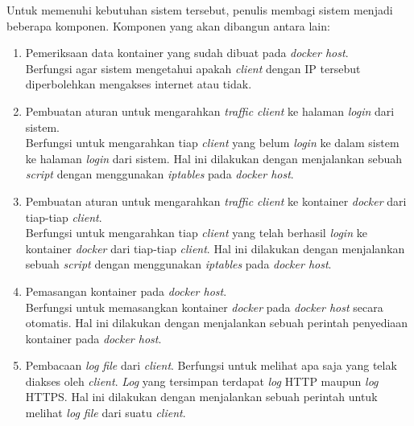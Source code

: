       \indent Untuk memenuhi kebutuhan sistem tersebut, penulis membagi sistem menjadi beberapa komponen. Komponen yang akan dibangun antara lain: 
      \begin{enumerate} 
	  \item Pemeriksaan data kontainer yang sudah dibuat pada \textit{docker host}.\\
		  Berfungsi agar sistem mengetahui apakah \textit{client} dengan IP tersebut diperbolehkan mengakses internet atau tidak.
	  \item Pembuatan aturan untuk mengarahkan \textit{traffic client} ke halaman \textit{login} dari sistem.\\
		  Berfungsi untuk mengarahkan tiap \textit{client} yang belum \textit{login} ke dalam sistem ke halaman \textit{login} dari sistem. Hal ini dilakukan dengan menjalankan sebuah \textit{script} dengan menggunakan \textit{iptables} pada \textit{docker host}.
	  \item Pembuatan aturan untuk mengarahkan \textit{traffic client} ke kontainer \textit{docker} dari tiap-tiap \textit{client}.\\
		  Berfungsi untuk mengarahkan tiap \textit{client} yang telah berhasil \textit{login} ke kontainer \textit{docker} dari tiap-tiap \textit{client}. Hal ini dilakukan dengan menjalankan sebuah \textit{script} dengan menggunakan \textit{iptables} pada \textit{docker host}.
	  \item Pemasangan kontainer pada \textit{docker host}.\\
		  Berfungsi untuk memasangkan kontainer \textit{docker} pada \textit{docker host} secara otomatis. Hal ini dilakukan dengan menjalankan sebuah perintah penyediaan kontainer pada \textit{docker host}.
	  \item Pembacaan \textit{log file} dari \textit{client}.
		  Berfungsi untuk melihat apa saja yang telak diakses oleh \textit{client}. \textit{Log} yang tersimpan terdapat \textit{log} HTTP maupun \textit{log} HTTPS. Hal ini dilakukan dengan menjalankan sebuah perintah untuk melihat \textit{log file} dari suatu \textit{client}.
        
      \end{enumerate}
      

